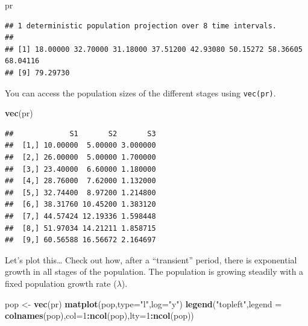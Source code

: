 \documentclass[
  a4paper]{book}
\newenvironment{Shaded}{\begin{snugshade}}{\end{snugshade}}
\newcommand{\AttributeTok}[1]{\textcolor[rgb]{0.13,0.29,0.53}{#1}}
\newcommand{\DecValTok}[1]{\textcolor[rgb]{0.00,0.00,0.81}{#1}}
\newcommand{\FunctionTok}[1]{\textcolor[rgb]{0.13,0.29,0.53}{\textbf{#1}}}
\newcommand{\NormalTok}[1]{#1}
\newcommand{\OtherTok}[1]{\textcolor[rgb]{0.56,0.35,0.01}{#1}}
\newcommand{\SpecialCharTok}[1]{\textcolor[rgb]{0.81,0.36,0.00}{\textbf{#1}}}
\newcommand{\StringTok}[1]{\textcolor[rgb]{0.31,0.60,0.02}{#1}}
\begin{document}
\begin{Shaded}
\begin{Highlighting}[]
\NormalTok{pr}
\end{Highlighting}
\end{Shaded}

\begin{verbatim}
## 1 deterministic population projection over 8 time intervals.
## 
## [1] 18.00000 32.70000 31.18000 37.51200 42.93080 50.15272 58.36605 68.04116
## [9] 79.29730
\end{verbatim}

You can access the population sizes of the different stages using \texttt{vec(pr)}.

\begin{Shaded}
\begin{Highlighting}[]
\FunctionTok{vec}\NormalTok{(pr)}
\end{Highlighting}
\end{Shaded}

\begin{verbatim}
##             S1       S2       S3
##  [1,] 10.00000  5.00000 3.000000
##  [2,] 26.00000  5.00000 1.700000
##  [3,] 23.40000  6.60000 1.180000
##  [4,] 28.76000  7.62000 1.132000
##  [5,] 32.74400  8.97200 1.214800
##  [6,] 38.31760 10.45200 1.383120
##  [7,] 44.57424 12.19336 1.598448
##  [8,] 51.97034 14.21211 1.858715
##  [9,] 60.56588 16.56672 2.164697
\end{verbatim}

Let's plot this\ldots{} Check out how, after a ``transient'' period, there is exponential growth in all stages of the population. The population is growing steadily with a fixed population growth rate (\(\lambda\)).

\begin{Shaded}
\begin{Highlighting}[]
\NormalTok{pop }\OtherTok{\textless{}{-}} \FunctionTok{vec}\NormalTok{(pr)}
\FunctionTok{matplot}\NormalTok{(pop,}\AttributeTok{type=}\StringTok{"l"}\NormalTok{,}\AttributeTok{log=}\StringTok{"y"}\NormalTok{)}
\FunctionTok{legend}\NormalTok{(}\StringTok{"topleft"}\NormalTok{,}\AttributeTok{legend =} \FunctionTok{colnames}\NormalTok{(pop),}\AttributeTok{col=}\DecValTok{1}\SpecialCharTok{:}\FunctionTok{ncol}\NormalTok{(pop),}\AttributeTok{lty=}\DecValTok{1}\SpecialCharTok{:}\FunctionTok{ncol}\NormalTok{(pop))}
\end{Highlighting}
\end{Shaded}
\end{document}
